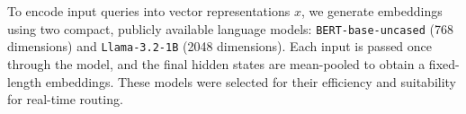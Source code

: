 \documentclass{article}
\theoremstyle{remark}
\begin{document}



To encode input queries into vector representations \(x\), we generate embeddings using two compact, publicly available language models: \texttt{BERT-base-uncased} (768 dimensions) and \texttt{Llama-3.2-1B} (2048 dimensions). Each input is passed once through the model, and the final hidden states are mean-pooled to obtain a fixed-length embeddings. These models were selected for their efficiency and suitability for real-time routing.
\end{document}
